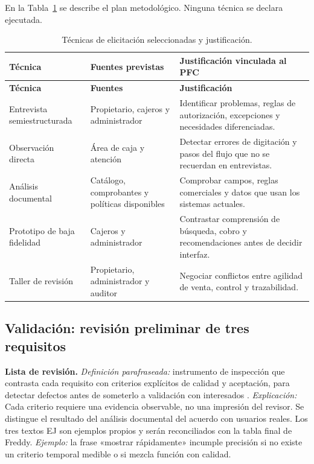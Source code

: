 \documentclass[onecolumn,12pt,a4paper]{IEEEtran}
\begin{document}
En la Tabla~\ref{tab:tecnicas} se describe el plan metodológico. Ninguna técnica se declara ejecutada.
\small
\begin{longtable}{@{}p{3.2cm}p{4.3cm}p{7.5cm}@{}}
\caption{Técnicas de elicitación seleccionadas y justificación.}\label{tab:tecnicas}\\
\toprule\textbf{Técnica} & \textbf{Fuentes previstas} & \textbf{Justificación vinculada al PFC}\\\midrule\endfirsthead
\toprule\textbf{Técnica} & \textbf{Fuentes} & \textbf{Justificación}\\\midrule\endhead
Entrevista semiestructurada & Propietario, cajeros y administrador & Identificar problemas, reglas de autorización, excepciones y necesidades diferenciadas.\\
Observación directa & Área de caja y atención & Detectar errores de digitación y pasos del flujo que no se recuerdan en entrevistas.\\
Análisis documental & Catálogo, comprobantes y políticas disponibles & Comprobar campos, reglas comerciales y datos que usan los sistemas actuales.\\
Prototipo de baja fidelidad & Cajeros y administrador & Contrastar comprensión de búsqueda, cobro y recomendaciones antes de decidir interfaz.\\
Taller de revisión & Propietario, administrador y auditor & Negociar conflictos entre agilidad de venta, control y trazabilidad.\\
\bottomrule\end{longtable}
\normalsize

\subsection{Validación: revisión preliminar de tres requisitos}

\textbf{Lista de revisión.} \emph{Definición parafraseada:} instrumento de inspección que contrasta cada requisito con criterios explícitos de calidad y aceptación, para detectar defectos antes de someterlo a validación con interesados \cite{iso29148,ireb2023}. \emph{Explicación:} Cada criterio requiere una evidencia observable, no una impresión del revisor. Se distingue el resultado del análisis documental del acuerdo con usuarios reales. Los tres textos EJ son ejemplos propios y serán reconciliados con la tabla final de Freddy. \emph{Ejemplo:} la frase «mostrar rápidamente» incumple precisión si no existe un criterio temporal medible o si mezcla función con calidad.
\end{document}
